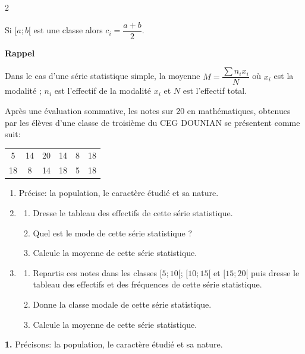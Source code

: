 \begin{multicols*}{2}
{ 		 Si $[a;b[$ est une classe alors $c_{i}=\dfrac{a+b}{2}$.
 		
 		\textbf{\large Rappel}
 		
 		Dans le cas d'une série statistique simple, la  moyenne $M=\dfrac{\sum n_{i}x_{i}}{N}$ où $x_{i}$ est la modalité ; $n_{i}$ est l'effectif de la modalité $x_{i}$ et $N$ est l'effectif total. }
 	
 	Après une évaluation sommative, les notes sur 20 en mathématiques, obtenues par les élèves d'une classe de troisième du CEG DOUNIAN se présentent comme suit:  
 	
 	\begin{tabular}{cccccc}
 		\hline
 		5 & 14 & 20 & 14 & 8& 18 \\
 		18 & 8 & 14 & 18 & 5 & 18 \\
 		\hline
 	\end{tabular}
 	\begin{enumerate}
 		\item Précise: la population, le caractère étudié et sa nature.
 		\item 
 		\begin{enumerate}
 			\item Dresse le tableau des effectifs de cette série statistique.
 			\item Quel est le mode de cette série statistique ? 
 			\item Calcule la moyenne de cette série statistique.	
 		\end{enumerate}
 		\item 
 		\begin{enumerate}
 			\item Repartis ces notes dans les classes $[5;10[$; $[10;15[$ et $[15;20[$ puis dresse le tableau des effectifs et des fréquences de cette série statistique.
 			\item  Donne la classe modale de cette série statistique.
 			\item Calcule la moyenne de cette série statistique.
 		\end{enumerate}
 	\end{enumerate}
 	\dure
 	\resul
 	\textbf{1.} Précisons: la population, le caractère étudié et sa nature.
 	

\end{multicols*}
